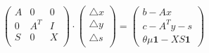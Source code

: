 \documentclass[a4paper, utf8, 11pt, colorlinks]{article}
\begin{document}
\begin{equation} \label{eq:newton-interior-system-k}    
	\begin{pmatrix}
		A   & 0      &  0      \\
		0   & A^T    &  I      \\
		S   & 0      & X       \\
	\end{pmatrix} 
	\cdot 
	\begin{pmatrix}
		\bigtriangleup  x  \\
		\bigtriangleup  y  \\
		\bigtriangleup  s  \\
	\end{pmatrix} 
	=
	\begin{pmatrix}
		b - Ax           \\
		c - A^T y - s      \\
		\theta \mu \mathbf{1} - X S \textbf{1}                      
	\end{pmatrix}
\end{equation}
\end{document}
